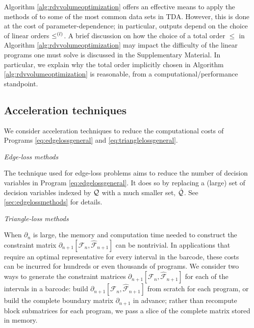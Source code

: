 \begin{remark} Algorithm \ref{alg:rdvvolumeoptimization} offers an effective means to apply the methods of \cite{Obayashi2018} to some of the most common data sets in TDA.  However, this is done at the cost of parameter-dependence; in particular, outputs depend on the choice of linear orders $\le^{(l)}$.  
 A brief discussion on how the choice of a total order $\le$ in Algorithm \ref{alg:rdvvolumeoptimization} may impact the difficulty of the linear programs one must solve is discussed in the Supplementary Material.  In particular, we explain why the total order implicitly chosen in Algorithm \ref{alg:rdvvolumeoptimization} is reasonable,  from a computational/performance standpoint.
\end{remark}


 
\subsection{Acceleration techniques} \label{acceleratation technique}
 
We consider acceleration techniques to reduce the computational costs of Programs \eqref{eq:edgelossgeneral} and \eqref{eq:trianglelossgeneral}.

\noindent \emph{Edge-loss methods} 

The technique used for edge-loss problems aims to reduce the number of decision variables in Program \eqref{eq:edgelossgeneral}.  It does so by replacing a (large) set of decision variables indexed by $\mathcal Q$ with a much smaller set, $\hat {\mathcal Q}$.  See \se \ref{sec:edgelossmethods} for details.
 
\noindent\emph{Triangle-loss methods}  

When $\partial_n$ is large, the memory and computation time needed to construct the constraint matrix $\partial_{n+1}[\mathcal{F}_n, \hat {\mathcal{F}}_{n+1} ]$ can be nontrivial.  In applications that require an optimal representative for every interval in the barcode, these costs can be incurred for hundreds or even thousands of programs. We consider two ways to generate the constraint matrices $\partial_{n+1}[\mathcal{F}_n, \hat {\mathcal{F}}_{n+1} ]$ for each of the intervals in a barcode: build $\partial_{n+1}[\mathcal{F}_n, \hat {\mathcal{F}}_{n+1} ]$ from scratch for each program, or build the complete boundary matrix $\partial_{n+1}$ in advance; rather than recompute block submatrices for each program, we pass a slice of the complete matrix stored in memory.  

